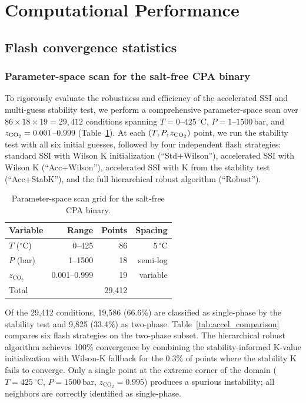 \documentclass[preprint,12pt,number]{elsarticle}
\begin{document}
\section{Computational Performance}
\label{sec:performance}

\subsection{Flash convergence statistics}
\label{sec:convergence}

\subsubsection{Parameter-space scan for the salt-free CPA binary}

To rigorously evaluate the robustness and efficiency of the accelerated SSI and
multi-guess stability test, we perform a comprehensive parameter-space scan over
$86 \times 18 \times 19 = 29{,}412$ conditions spanning
$T = 0$--$425\,^\circ$C, $P = 1$--$1500$\,bar, and
$z_{\rm CO_2} = 0.001$--$0.999$ (Table~\ref{tab:scan_grid}).
At each $(T, P, z_{\rm CO_2})$ point, we run the stability test with all six initial guesses,
followed by four independent flash strategies:
standard SSI with Wilson K initialization (``Std+Wilson''),
accelerated SSI with Wilson K (``Acc+Wilson''),
accelerated SSI with K from the stability test (``Acc+StabK''),
and the full hierarchical robust algorithm (``Robust'').

\begin{table}[H]
  \centering
  \caption{Parameter-space scan grid for the salt-free CPA binary.}
  \label{tab:scan_grid}
  \begin{tabular}{lrrr}
    \toprule
    Variable & Range & Points & Spacing \\
    \midrule
    $T$ ($^\circ$C)      & 0--425    & 86 & $5\,^\circ$C \\
    $P$ (bar)            & 1--1500   & 18 & semi-log \\
    $z_{\text{CO}_2}$    & 0.001--0.999 & 19 & variable \\
    \midrule
    Total                &           & 29{,}412 & \\
    \bottomrule
  \end{tabular}
\end{table}

Of the 29{,}412 conditions, 19{,}586 (66.6\%) are classified as single-phase by the
stability test and 9{,}825 (33.4\%) as two-phase.
Table~\ref{tab:accel_comparison} compares six flash strategies on the
two-phase subset.
The hierarchical robust algorithm achieves 100\% convergence by combining the
stability-informed K-value initialization with Wilson-K fallback for the
0.3\% of points where the stability K fails to converge.
Only a single point at the extreme corner of the domain ($T = 425\,^\circ$C,
$P = 1500$\,bar, $z_{\text{CO}_2} = 0.995$) produces a spurious instability;
all neighbors are correctly identified as single-phase.
\end{document}
